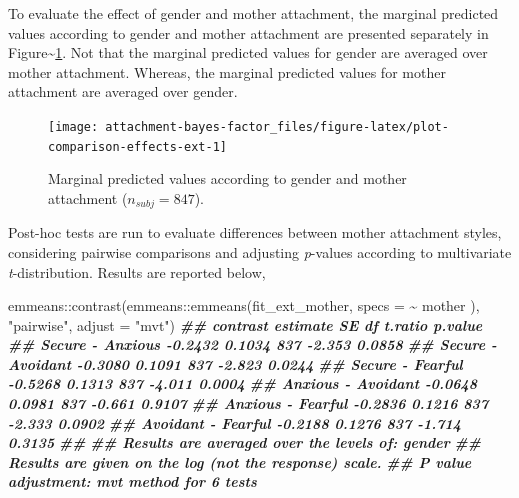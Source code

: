 \documentclass[
]{book}
\newenvironment{Shaded}{\begin{snugshade}}{\end{snugshade}}
\newcommand{\AttributeTok}[1]{\textcolor[rgb]{0.77,0.63,0.00}{#1}}
\newcommand{\DocumentationTok}[1]{\textcolor[rgb]{0.56,0.35,0.01}{\textbf{\textit{#1}}}}
\newcommand{\FunctionTok}[1]{\textcolor[rgb]{0.00,0.00,0.00}{#1}}
\newcommand{\NormalTok}[1]{#1}
\newcommand{\SpecialCharTok}[1]{\textcolor[rgb]{0.00,0.00,0.00}{#1}}
\newcommand{\StringTok}[1]{\textcolor[rgb]{0.31,0.60,0.02}{#1}}
\begin{document}
To evaluate the effect of gender and mother attachment, the marginal predicted values according to gender and mother attachment are presented separately in Figure\textasciitilde\ref{fig:plot-comparison-effects-ext}. Not that the marginal predicted values for gender are averaged over mother attachment. Whereas, the marginal predicted values for mother attachment are averaged over gender.

\begin{figure}

{\centering \texttt{[image: attachment-bayes-factor\_files/figure-latex/plot-comparison-effects-ext-1]} 

}

\caption{Marginal predicted values according to gender and mother attachment ($n_{subj} = 847$).}\label{fig:plot-comparison-effects-ext}
\end{figure}

Post-hoc tests are run to evaluate differences between mother attachment styles, considering pairwise comparisons and adjusting \emph{p}-values according to multivariate \emph{t}-distribution. Results are reported below,

\begin{Shaded}
\begin{Highlighting}[]
\NormalTok{emmeans}\SpecialCharTok{::}\FunctionTok{contrast}\NormalTok{(emmeans}\SpecialCharTok{::}\FunctionTok{emmeans}\NormalTok{(fit\_ext\_mother, }\AttributeTok{specs =} \SpecialCharTok{\textasciitilde{}}\NormalTok{ mother ),}
                  \StringTok{"pairwise"}\NormalTok{, }\AttributeTok{adjust =} \StringTok{"mvt"}\NormalTok{)}
\DocumentationTok{\#\#  contrast           estimate     SE  df t.ratio p.value}
\DocumentationTok{\#\#  Secure {-} Anxious    {-}0.2432 0.1034 837  {-}2.353  0.0858}
\DocumentationTok{\#\#  Secure {-} Avoidant   {-}0.3080 0.1091 837  {-}2.823  0.0244}
\DocumentationTok{\#\#  Secure {-} Fearful    {-}0.5268 0.1313 837  {-}4.011  0.0004}
\DocumentationTok{\#\#  Anxious {-} Avoidant  {-}0.0648 0.0981 837  {-}0.661  0.9107}
\DocumentationTok{\#\#  Anxious {-} Fearful   {-}0.2836 0.1216 837  {-}2.333  0.0902}
\DocumentationTok{\#\#  Avoidant {-} Fearful  {-}0.2188 0.1276 837  {-}1.714  0.3135}
\DocumentationTok{\#\# }
\DocumentationTok{\#\# Results are averaged over the levels of: gender }
\DocumentationTok{\#\# Results are given on the log (not the response) scale. }
\DocumentationTok{\#\# P value adjustment: mvt method for 6 tests}
\end{Highlighting}
\end{Shaded}
\end{document}
